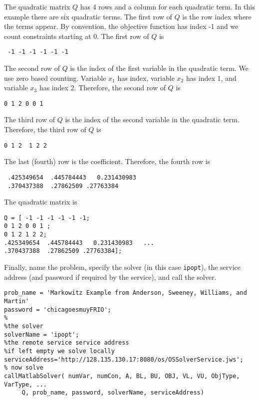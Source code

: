 \documentclass[11pt]{article}
\renewcommand{\_}{{\char"5F}}
\renewcommand{\{}{{\char"7B}}
\renewcommand{\}}{{\char"7D}}
\renewcommand{\^}{{\char"0D}}
\renewcommand{\'}{{\char"0D}}
\begin{document}
 The quadratic matrix $Q$ has 4 rows and a column for each quadratic term. In this example there are six quadratic terms.  The first row of $Q$ is the row index where the terms appear. By convention, the objective function has index -1 and we count constraints starting at 0.  The first row of $Q$ is

 
 \begin{verbatim}
 -1 -1 -1 -1 -1 -1
 \end{verbatim}

The second row of $Q$ is the index of the first variable in the quadratic term. We use zero based counting.  Variable $x_{1}$ has index, variable  $x_{2}$ has index 1, and variable $x_{3}$ has index 2.  Therefore, the second row of $Q$ is



\begin{verbatim}
0 1 2 0 0 1
\end{verbatim} 



The third row of $Q$ is the index of the second variable in the quadratic term.   Therefore, the third row of $Q$ is



\begin{verbatim}
0 1 2  1 2 2
\end{verbatim} 



The last (fourth) row is the coefficient. Therefore, the fourth row is





\begin{verbatim}
 .425349654  .445784443   0.231430983   
 .370437388  .27862509 .27763384
\end{verbatim}


The quadratic matrix is



\begin{verbatim}
Q = [ -1 -1 -1 -1 -1 -1;
0 1 2 0 0 1 ;
0 1 2 1 2 2;
.425349654  .445784443   0.231430983   ...
.370437388  .27862509 .27763384];
\end{verbatim}


Finally, name the problem, specify the solver (in this case {\tt ipopt}), the service address (and password if required by the service), and call the solver.



\begin{verbatim}
prob_name = 'Markowitz Example from Anderson, Sweeney, Williams, and Martin'
password = 'chicagoesmuyFRIO';
%
%the solver
solverName = 'ipopt';
%the remote service service address
%if left empty we solve locally
serviceAddress='http://128.135.130.17:8080/os/OSSolverService.jws';
% now solve
callMatlabSolver( numVar, numCon, A, BL, BU, OBJ, VL, VU, ObjType, VarType, ...
     Q, prob_name, password, solverName, serviceAddress)
\end{verbatim}
\end{document}

